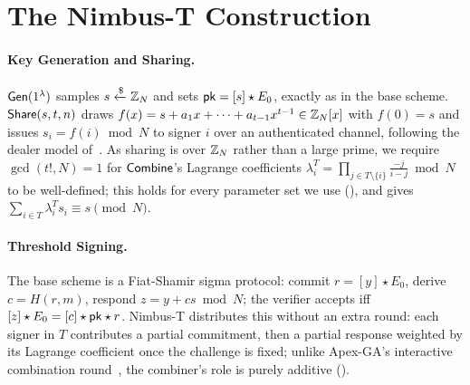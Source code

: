 \section{The Nimbus-T Construction}
\label{sec:construction}

\paragraph{Key Generation and Sharing.}
$\mathsf{Gen}(1^\lambda)$ samples $s \xleftarrow{\$} \mathbb{Z}_N$ and sets $\mathsf{pk} = [s]\star E_0$, exactly as in the base scheme. $\mathsf{Share}(s,t,n)$ draws $f(x) = s + a_1 x + \dots + a_{t-1}x^{t-1} \in \mathbb{Z}_N[x]$ with $f(0)=s$ and issues $s_i = f(i) \bmod N$ to signer $i$ over an authenticated channel, following the dealer model of~\cite{tran2024dkg}. As sharing is over $\mathbb{Z}_N$ rather than a large prime, we require $\gcd(t!,N)=1$ for $\mathsf{Combine}$'s Lagrange coefficients $\lambda_i^T = \prod_{j \in T\setminus\{i\}} \frac{-j}{i-j} \bmod N$ to be well-defined; this holds for every parameter set we use (), and gives $\sum_{i\in T}\lambda_i^T s_i \equiv s \pmod N$.

\paragraph{Threshold Signing.}
The base scheme is a Fiat-Shamir sigma protocol: commit $r=[y]\star E_0$, derive $c = H(r,m)$, respond $z = y+cs \bmod N$; the verifier accepts iff $[z]\star E_0 = [c]\star\mathsf{pk}\star r$. Nimbus-T distributes this without an extra round: each signer in $T$ contributes a partial commitment, then a partial response weighted by its Lagrange coefficient once the challenge is fixed; unlike Apex-GA's interactive combination round~\cite{voss2023apexga}, the combiner's role is purely additive ().

